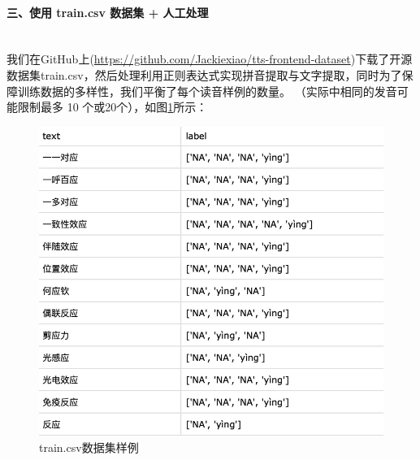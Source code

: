 \documentclass[12pt,hyperref,a4paper,UTF8]{ctexart}
\begin{document}
\paragraph{三、使用 train.csv 数据集 + 人工处理}\leavevmode\\
\indent 我们在GitHub上(\url{https://github.com/Jackiexiao/tts-frontend-dataset})下载了开源数据集train.csv，然后处理利用正则表达式实现拼音提取与文字提取，同时为了保障训练数据的多样性，我们平衡了每个读音样例的数量。 （实际中相同的发音可能限制最多 10 个或20个），如图\ref{fig93}所示：
\begin{figure}[H]%
    \centering
    \includegraphics[width=0.5\linewidth]{figures/image2.png}
    \caption{train.csv数据集样例}
    \label{fig93}
\end{figure}
\end{document}
